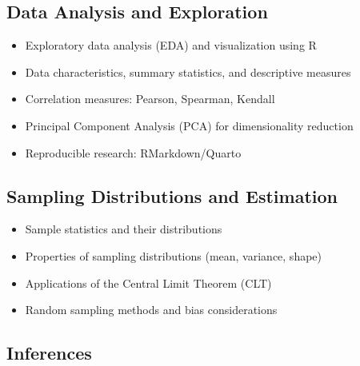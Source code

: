 \documentclass[
  a4paper,
  DIV=11,
  numbers=noendperiod,
  oneside]{scrreprt}
\providecommand{\tightlist}{%
  \setlength{\itemsep}{0pt}\setlength{\parskip}{0pt}}
\theoremstyle{plain}
\theoremstyle{definition}
\theoremstyle{definition}
\theoremstyle{definition}
\theoremstyle{plain}
\theoremstyle{remark}
\begin{document}

\subsection*{Data Analysis and
Exploration}\label{data-analysis-and-exploration}

\begin{itemize}
\tightlist
\item
  Exploratory data analysis (EDA) and visualization using R\\
\item
  Data characteristics, summary statistics, and descriptive measures\\
\item
  Correlation measures: Pearson, Spearman, Kendall\\
\item
  Principal Component Analysis (PCA) for dimensionality reduction\\
\item
  Reproducible research: RMarkdown/Quarto
\end{itemize}

\subsection*{Sampling Distributions and
Estimation}\label{sampling-distributions-and-estimation}

\begin{itemize}
\tightlist
\item
  Sample statistics and their distributions\\
\item
  Properties of sampling distributions (mean, variance, shape)\\
\item
  Applications of the Central Limit Theorem (CLT)\\
\item
  Random sampling methods and bias considerations
\end{itemize}

\subsection*{Inferences}\label{inferences}
\end{document}
